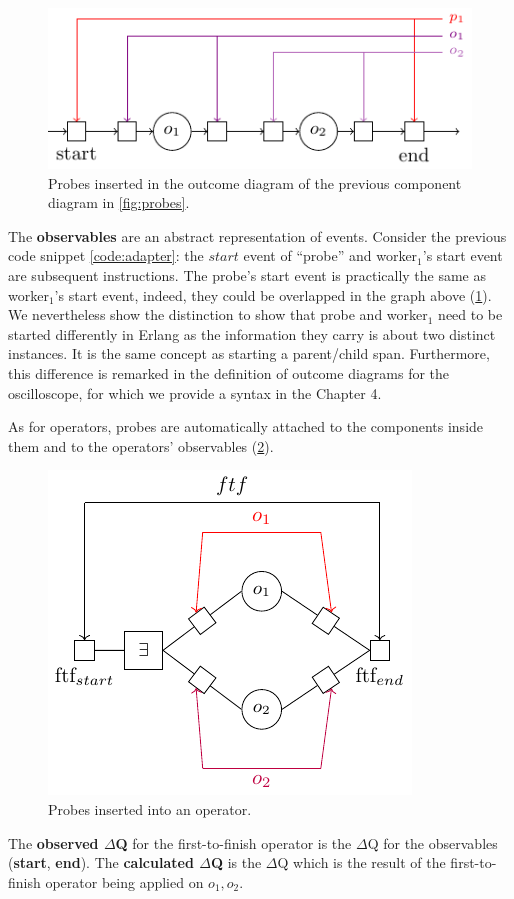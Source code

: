         \begin{figure}[H]
            \begin{center}
                \includegraphics[scale=1.3]{tikz/probe_1.pdf}
            \end{center}
            \caption{Probes inserted in the outcome diagram of the previous component diagram in \cref{fig:probes}.}
            \label{fig:probes_o}
        \end{figure}
       
    The \textbf{observables} are an abstract representation of events. Consider the previous code snippet \cref{code:adapter}: the $start$ event of ``probe'' and worker$_1$'s start event are subsequent instructions. The probe's start event is practically the same as worker$_1$'s start event, indeed, they could be overlapped in the graph above (\cref{fig:probes_o}). We nevertheless show the distinction to show that probe and worker$_1$ need to be started differently in Erlang as the information they carry is about two distinct instances. It is the same concept as starting a parent/child span. Furthermore, this difference is remarked in the definition of outcome diagrams for the oscilloscope, for which we provide a syntax in the Chapter 4. 
    
    As for operators, probes are automatically attached to the components inside them and to the operators' observables (\cref{fig:probes_op}). 

       \begin{figure}[H]
           \begin{center}
                \includegraphics[scale = 1.3]{tikz/probe_2.pdf}
            \end{center}
            \label{fig:probes_op}
            \caption{Probes inserted into an operator.}
       \end{figure}
    
    The \textbf{observed $\Delta$Q} for the first-to-finish operator is the $\Delta$Q for the observables (\textbf{start}, \textbf{end}). The \textbf{calculated $\Delta$Q} is the $\Delta$Q which is the result of the first-to-finish operator being applied on $o_1, o_2$.
